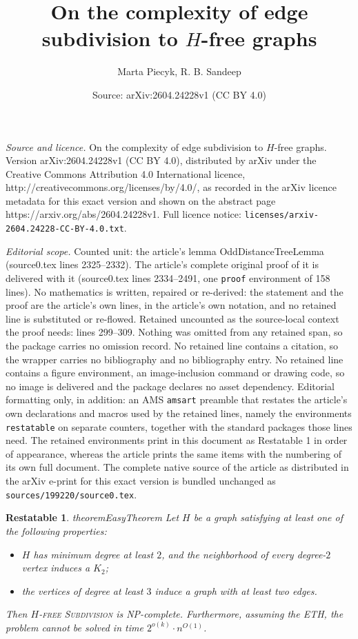 \documentclass[10pt,a4paper]{amsart}
\title{On the complexity of edge subdivision to $H$-free graphs}
\author{Marta Piecyk, R. B. Sandeep}
\date{Source: arXiv:2604.24228v1 (CC BY 4.0)}
\newtheorem{restatable}{Restatable}
\begin{document}
\maketitle

\noindent\emph{Source and licence.} On the complexity of edge subdivision to $H$-free graphs. Version arXiv:2604.24228v1 (CC BY 4.0), distributed by arXiv under the Creative Commons Attribution 4.0 International licence, http://creativecommons.org/licenses/by/4.0/, as recorded in the arXiv licence metadata for this exact version and shown on the abstract page https://arxiv.org/abs/2604.24228v1. Full licence notice: \texttt{licenses/arxiv-2604.24228-CC-BY-4.0.txt}.\par\smallskip

\noindent\textit{Editorial scope.} Counted unit: the article's lemma OddDistanceTreeLemma (source0.tex lines 2325--2332). The article's complete original proof of it is delivered with it (source0.tex lines 2334--2491, one \texttt{proof} environment of 158 lines). No mathematics is written, repaired or re-derived: the statement and the proof are the article's own lines, in the article's own notation, and no retained line is substituted or re-flowed.  Retained uncounted as the source-local context the proof needs: lines 299--309.  Nothing was omitted from any retained span, so the package carries no omission record.  No retained line contains a citation, so the wrapper carries no bibliography and no bibliography entry.  No retained line contains a figure environment, an image-inclusion command or drawing code, so no image is delivered and the package declares no asset dependency.  Editorial formatting only, in addition: an AMS \texttt{amsart} preamble that restates the article's own declarations and macros used by the retained lines, namely the environments \texttt{restatable} on separate counters, together with the standard packages those lines need.  The retained environments print in this document as Restatable 1 in order of appearance, whereas the article prints the same items with the numbering of its own full document.  The complete native source of the article as distributed in the arXiv e-print for this exact version is bundled unchanged as \texttt{sources/199220/source0.tex}.
\begin{restatable}{theorem}{EasyTheorem}
\label{thm:easy}
Let $H$ be a graph satisfying at least one of the following properties:
\begin{itemize}
    \item $H$ has minimum degree at least $2$, and the neighborhood of every degree-$2$ vertex induces a $K_2$;
    \item the vertices of degree at least $3$ induce a graph with at least two edges.
\end{itemize}
Then \textsc{$H$-free Subdivision} is NP-complete.
Furthermore, assuming the ETH, the problem cannot be solved in time
$2^{o(k)}\cdot n^{O(1)}$.
\end{restatable}
\end{document}
